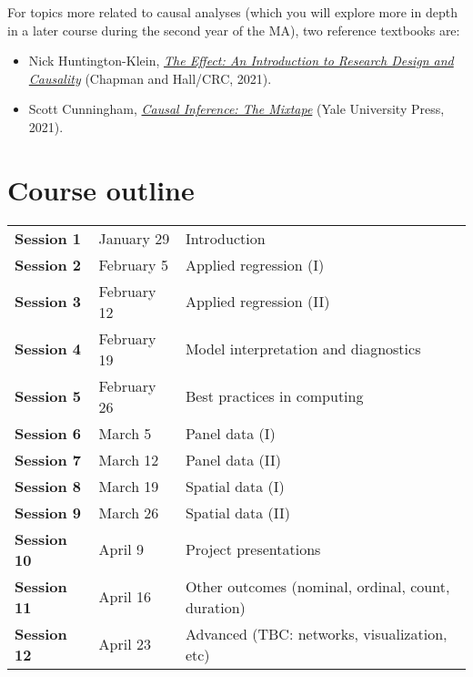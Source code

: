 \documentclass[12pt, a4paper]{article}
\begin{document}
For topics more related to causal analyses (which you will explore more in depth in a later course during the second year of the MA), two reference textbooks are:

\begin{itemize}
\setlength\itemsep{-5pt}
  \item Nick Huntington-Klein, \href{https://theeffectbook.net/}{\textit{The Effect: An Introduction to Research Design and Causality}} (Chapman and Hall/CRC, 2021).
  \item Scott Cunningham, \href{https://mixtape.scunning.com/}{\textit{Causal Inference: The Mixtape}} (Yale University Press, 2021).
\end{itemize}

\section{Course outline}


\begin{table*}[!ht]
  \centering

  \begin{tabular}{lll}
    \textbf{Session 1} & January 29 & Introduction \\
    \textbf{Session 2} & February 5 & Applied regression (I) \\
    \textbf{Session 3} & February 12 & Applied regression (II) \\
    \textbf{Session 4} & February 19 & Model interpretation and diagnostics \\
    \textbf{Session 5} & February 26 & Best practices in computing \\
    \textbf{Session 6} & March 5 & Panel data (I) \\
    \textbf{Session 7} & March 12 & Panel data (II) \\
    \textbf{Session 8} & March 19 & Spatial data (I) \\
    \textbf{Session 9} & March 26 & Spatial data (II) \\
    \textbf{Session 10} & April 9 & Project presentations \\
    \textbf{Session 11} & April 16 & Other outcomes (nominal, ordinal, count, duration) \\
    \textbf{Session 12} & April 23 & Advanced (TBC: networks, visualization, etc) \\
  \end{tabular}
\end{table*}

\end{document}
